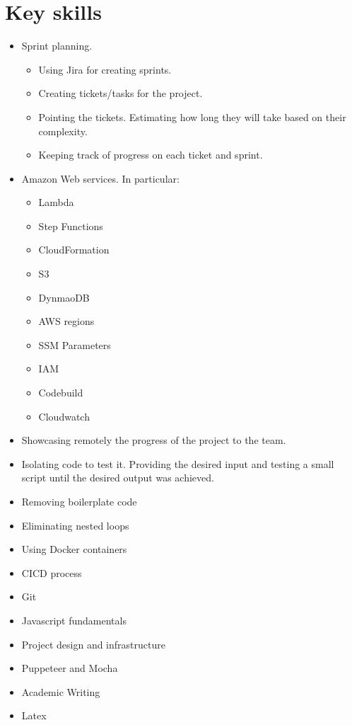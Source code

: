 \documentclass[12pt,a4paper,titlepage]{report}
\begin{document}
\section{Key skills}
\begin{itemize}
  \item Sprint planning. 
    \begin{itemize}
      \item Using Jira for creating sprints.
      \item Creating tickets/tasks for the project.
      \item Pointing the tickets. Estimating how long they will take based on their complexity.
      \item Keeping track of progress on each ticket and sprint.
    \end{itemize}
  \item Amazon Web services. In particular:
    \begin{itemize}
      \item Lambda 
      \item Step Functions 
      \item CloudFormation 
      \item S3 
      \item DynmaoDB 
      \item AWS regions 
      \item SSM Parameters
      \item IAM
      \item Codebuild
      \item Cloudwatch
    \end{itemize}
  \item Showcasing remotely the progress of the project to the team.
  \item Isolating code to test it. Providing the desired input and testing a small script until the desired output was achieved.
  \item Removing boilerplate code
  \item Eliminating nested loops
  \item Using Docker containers
  \item CICD process
  \item Git
  \item Javascript fundamentals
  \item Project design and infrastructure
  \item Puppeteer and Mocha
  \item Academic Writing
  \item Latex
\end{itemize}
\end{document}
